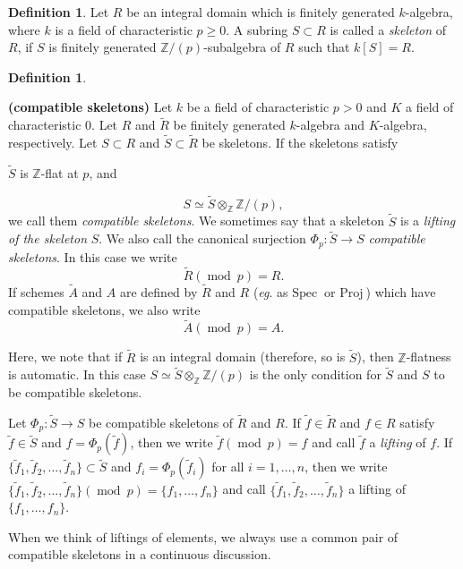 \documentclass[a4paper]{amsart}
\def\ZZ{{\mathbb{Z}}}
\newcommand{\spec}{{\mathrm{Spec \ }}}
\newcommand{\proj}{{\mathrm{Proj\ }}}
\renewcommand{\wr}{{\widetilde R}}
\newcommand{\tf}{{\tilde f}}
\newcommand{\wa}{{\widetilde{A}}}
\newcommand{\ws}{{\widetilde{S}}}
\newcommand{\zp}{{\ZZ/(p)}}
\renewcommand{\mod}{{\operatorname{mod}\ }}
\theoremstyle{definition}
\newtheorem{defn}[thm]{Definition}
\begin{document}
\begin{defn} Let $R$ be an integral domain which is finitely generated $k$-algebra,
  where $k$ is a field of characteristic $p\geq 0$.
  A subring $S\subset R$ is called a {\sl skeleton} of $R$, 
  if $S$ is finitely generated $\zp$-subalgebra of $R$ such that $k[S]=R$.
\end{defn}

\begin{defn}\label{def-of-lift-elem}

{\bf (compatible skeletons)}
   Let $k$ be a field of characteristic $p>0$ and $K$ a field of characteristic $0$.
   Let $R$ and $\wr$ be  finitely generated $k$-algebra and 
   $K$-algebra, respectively.
   Let $S\subset R$ and $\ws\subset \wr$ be skeletons.
   If the skeletons satisfy  
   \begin{center}
    $\ws$ is $\ZZ$-flat at $p$, and
   \end{center}
   $$S\simeq\ws\otimes_\ZZ \zp,$$  we call them {\sl compatible skeletons}.
   We  sometimes say that a skeleton $\ws$ is a {\sl lifting of the skeleton} $S$.
   We also call the canonical surjection $\Phi_p:\ws\to S$ {\sl compatible skeletons}.
   In this case we write $$\wr (\mod p)=R.$$ 
   If schemes $\wa$ and $A$  are defined by $\wr$ and $R$ ({\it  eg}. as $\spec$ or $\proj$)
   which have compatible skeletons, we also write 
   $$\wa (\mod p) =A.$$
  
  Here, we note that if $\wr$ is an integral domain (therefore, so is $\ws$), then $\ZZ$-flatness is automatic. 
  In this case $S\simeq\ws\otimes_\ZZ \zp$ is the only condition for $\ws$ and $S$ to be compatible skeletons.
 
   Let $\Phi_p:\ws\to S$ be compatible skeletons of $\wr$ and $R$.
   If $\tf\in \wr$ and $f\in R$ satisfy 
   $\tf\in\ws$ and $f=\Phi_p(\tf)$, then we write $\tf (\mod p)=f$ and call $\tf$ a {\sl  lifting} of $f$.
   If $\{\tf_1,\tf_2,\ldots, \tf_n \}\subset \ws$ and $f_i=\Phi_p(\tf_i)$ for all $i=1,\ldots, n$, then we 
   write $\{\tf_1,\tf_2,\ldots, \tf_n \} (\mod p)=\{f_1,\ldots, f_n\}$ and call $\{\tf_1,\tf_2,\ldots, \tf_n \} $
   a lifting of $\{f_1,\ldots, f_n\}$.
 
 \end{defn}

When we think of liftings of elements, we always use a common pair of  compatible skeletons in a continuous 
discussion.
%
\end{document}
